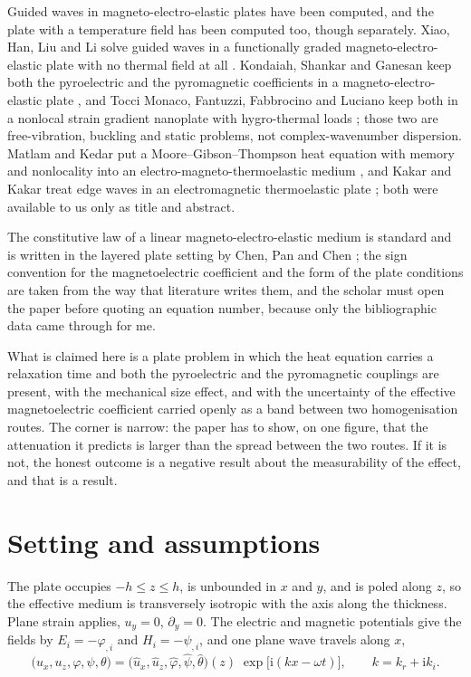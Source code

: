 \documentclass[11pt]{article}
\newcommand{\ii}{\mathrm{i}}
\begin{document}
Guided waves in magneto-electro-elastic plates have been computed, and the plate with a temperature field
has been computed too, though separately. Xiao, Han, Liu and Li solve guided waves in a functionally graded
magneto-electro-elastic plate with no thermal field at all \cite{Xiao2016}. Kondaiah, Shankar and Ganesan
keep both the pyroelectric and the pyromagnetic coefficients in a magneto-electro-elastic plate
\cite{Kondaiah2013}, and Tocci Monaco, Fantuzzi, Fabbrocino and Luciano keep both in a nonlocal strain
gradient nanoplate with hygro-thermal loads \cite{Tocci2021}; those two are free-vibration, buckling and
static problems, not complex-wavenumber dispersion. Matlam and Kedar put a Moore--Gibson--Thompson heat
equation with memory and nonlocality into an electro-magneto-thermoelastic medium \cite{Matlam2026}, and
Kakar and Kakar treat edge waves in an electromagnetic thermoelastic plate \cite{Kakar2015}; both were
available to us only as title and abstract.

The constitutive law of a linear magneto-electro-elastic medium is standard and is written in the layered
plate setting by Chen, Pan and Chen \cite{Chen2007}; the sign convention for the magnetoelectric
coefficient and the form of the plate conditions are taken from the way that literature writes them, and
the scholar must open the paper before quoting an equation number, because only the bibliographic data
came through for me.

What is claimed here is a plate problem in which the heat equation carries a relaxation time and both the
pyroelectric and the pyromagnetic couplings are present, with the mechanical size effect, and with the
uncertainty of the effective magnetoelectric coefficient carried openly as a band between two
homogenisation routes. The corner is narrow: the paper has to show, on one figure, that the attenuation it
predicts is larger than the spread between the two routes. If it is not, the honest outcome is a negative
result about the measurability of the effect, and that is a result.

\section{Setting and assumptions}\label{sec:setting}

The plate occupies $-h\le z\le h$, is unbounded in $x$ and $y$, and is poled along $z$, so the effective
medium is transversely isotropic with the axis along the thickness. Plane strain applies, $u_y=0$,
$\partial_y=0$. The electric and magnetic potentials give the fields by $E_i=-\varphi_{,i}$ and
$H_i=-\psi_{,i}$, and one plane wave travels along $x$,
\begin{equation}
\bigl(u_x,u_z,\varphi,\psi,\theta\bigr)
=\bigl(\hat u_x,\hat u_z,\hat\varphi,\hat\psi,\hat\theta\bigr)(z)\;
\exp\bigl[\ii(kx-\omega t)\bigr],
\qquad k=k_r+\ii k_i .
\end{equation}
\end{document}
